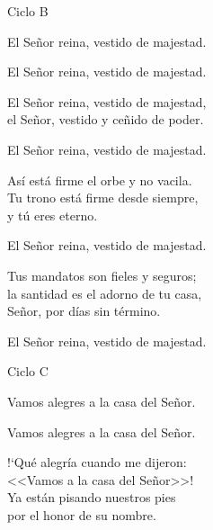 \documentclass[12pt, letterpaper]{report}
\begin{document}
    \begin{center}
        \LARGE Ciclo B
    \end{center}

    \noindent
    \LARGE El Se\~nor reina, vestido de majestad.

    \noindent
    El Se\~nor reina, vestido de majestad.

    \noindent
    El Se\~nor reina, vestido de majestad,\\
    el Se\~nor, vestido y ce\~nido de poder.

    \noindent
    El Se\~nor reina, vestido de majestad.

    \noindent
    As\'i est\'a firme el orbe y no vacila.\\
    Tu trono est\'a firme desde siempre,\\
    y t\'u eres eterno.

    \noindent
    El Se\~nor reina, vestido de majestad.

    \noindent
    Tus mandatos son fieles y seguros;\\
    la santidad es el adorno de tu casa,\\
    Se\~nor, por d\'ias sin t\'ermino.

    \noindent
    El Se\~nor reina, vestido de majestad.
    \clearpage



    \begin{center}
        \LARGE Ciclo C
    \end{center}

    \noindent
    \LARGE Vamos alegres a la casa del Se\~nor.

    \noindent
    Vamos alegres a la casa del Se\~nor.

    \noindent
    !`Qu\'e alegr\'ia cuando me dijeron:\\
    <<Vamos a la casa del Se\~nor>>!\\
    Ya est\'an pisando nuestros pies\\
    por el honor de su nombre.
\end{document}

